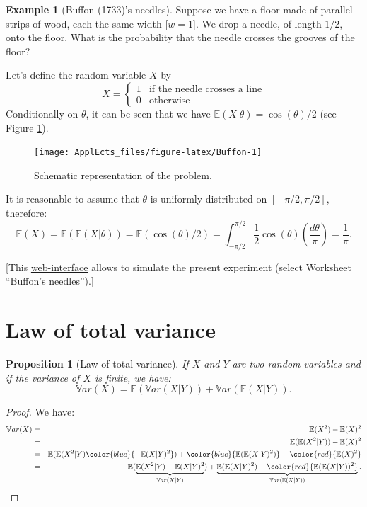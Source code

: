 \documentclass[
  12pt,
]{book}
\newtheorem{proposition}{Proposition}[chapter]
\theoremstyle{definition}
\theoremstyle{definition}
\newtheorem{example}{Example}[chapter]
\theoremstyle{definition}
\theoremstyle{definition}
\theoremstyle{remark}
\begin{document}
\begin{example}[Buffon (1733)'s needles]
\protect\hypertarget{exm:Buffon}{}\label{exm:Buffon}Suppose we have a floor made of parallel strips of wood, each the same width {[}\(w=1\){]}. We drop a needle, of length \(1/2\), onto the floor. What is the probability that the needle crosses the grooves of the floor?

Let's define the random variable \(X\) by
\[
X = \left\{
\begin{array}{cl}
1 & \mbox{if the needle crosses a line}\\
0 & \mbox{otherwise}
\end{array}
\right.
\]
Conditionally on \(\theta\), it can be seen that we have \(\mathbb{E}(X|\theta)=\cos(\theta)/2\) (see Figure \ref{fig:Buffon}).

\begin{figure}
\texttt{[image: ApplEcts\_files/figure-latex/Buffon-1]} \caption{Schematic representation of the problem.}\label{fig:Buffon}
\end{figure}

It is reasonable to assume that \(\theta\) is uniformly distributed on \([-\pi/2,\pi/2]\), therefore:
\[
\mathbb{E}(X)=\mathbb{E}(\mathbb{E}(X|\theta))=\mathbb{E}(\cos(\theta)/2)=\int_{-\pi/2}^{\pi/2}\frac{1}{2}\cos(\theta)\left(\frac{d\theta}{\pi}\right)=\frac{1}{\pi}.
\]

{[}This \href{https://jrenne.shinyapps.io/StatEcoII/}{web-interface} allows to simulate the present experiment (select Worksheet ``Buffon's needles'').{]}
\end{example}

\hypertarget{law-of-total-variance}{%
\section{Law of total variance}\label{law-of-total-variance}}

\begin{proposition}[Law of total variance]
\protect\hypertarget{prp:lawtotalvariance}{}\label{prp:lawtotalvariance}If \(X\) and \(Y\) are two random variables and if the variance of \(X\) is finite, we have:
\[
\boxed{\mathbb{V}ar(X) = \mathbb{E}(\mathbb{V}ar(X|Y)) + \mathbb{V}ar(\mathbb{E}(X|Y)).}
\]
\end{proposition}

\begin{proof}
We have:
\begin{eqnarray*}
\mathbb{V}ar(X) &=& \mathbb{E}(X^2) - \mathbb{E}(X)^2\\
&=& \mathbb{E}(\mathbb{E}(X^2|Y)) - \mathbb{E}(X)^2\\
&=& \mathbb{E}(\mathbb{E}(X^2|Y) \color{blue}{- \mathbb{E}(X|Y)^2}) +  \color{blue}{\mathbb{E}(\mathbb{E}(X|Y)^2)}  - \color{red}{\mathbb{E}(X)^2}\\
&=& \mathbb{E}(\underbrace{\mathbb{E}(X^2|Y) - \mathbb{E}(X|Y)^2}_{\mathbb{V}ar(X|Y)}) + \underbrace{\mathbb{E}(\mathbb{E}(X|Y)^2) - \color{red}{\mathbb{E}(\mathbb{E}(X|Y))^2}}_{\mathbb{V}ar(\mathbb{E}(X|Y))}.
\end{eqnarray*}
\end{proof}
\end{document}
